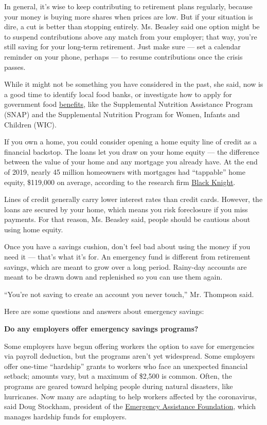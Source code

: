 In general, it's wise to keep contributing to retirement plans
regularly, because your money is buying more shares when prices are low.
But if your situation is dire, a cut is better than stopping entirely.
Ms. Beasley said one option might be to suspend contributions above any
match from your employer; that way, you're still saving for your
long-term retirement. Just make sure --- set a calendar reminder on your
phone, perhaps --- to resume contributions once the crisis passes.

While it might not be something you have considered in the past, she
said, now is a good time to identify local food banks, or investigate
how to apply for government food
\href{https://www.benefits.gov/benefit/361}{benefits}, like the
Supplemental Nutrition Assistance Program (SNAP) and the Supplemental
Nutrition Program for Women, Infants and Children (WIC).

If you own a home, you could consider opening a home equity line of
credit as a financial backstop. The loans let you draw on your home
equity --- the difference between the value of your home and any
mortgage you already have. At the end of 2019, nearly 45 million
homeowners with mortgages had ``tappable'' home equity, \$119,000 on
average, according to the research firm
\href{https://cdn.blackknightinc.com/wp-content/uploads/2020/02/BKI_MM_Jan2020_Report.pdf}{Black
Knight}.

Lines of credit generally carry lower interest rates than credit cards.
However, the loans are secured by your home, which means you risk
foreclosure if you miss payments. For that reason, Ms. Beasley said,
people should be cautious about using home equity.

Once you have a savings cushion, don't feel bad about using the money if
you need it --- that's what it's for. An emergency fund is different
from retirement savings, which are meant to grow over a long period.
Rainy-day accounts are meant to be drawn down and replenished so you can
use them again.

``You're not saving to create an account you never touch,'' Mr. Thompson
said.

Here are some questions and answers about emergency savings:

\textbf{Do any employers offer emergency savings programs?}

Some employers have begun offering workers the option to save for
emergencies via payroll deduction, but the programs aren't yet
widespread. Some employers offer one-time ``hardship'' grants to workers
who face an unexpected financial setback; amounts vary, but a maximum of
\$2,500 is common. Often, the programs are geared toward helping people
during natural disasters, like hurricanes. Now many are adapting to help
workers affected by the coronavirus, said Doug Stockham, president of
the \href{https://emergencyassistancefdn.org/}{Emergency Assistance
Foundation}, which manages hardship funds for employers.

